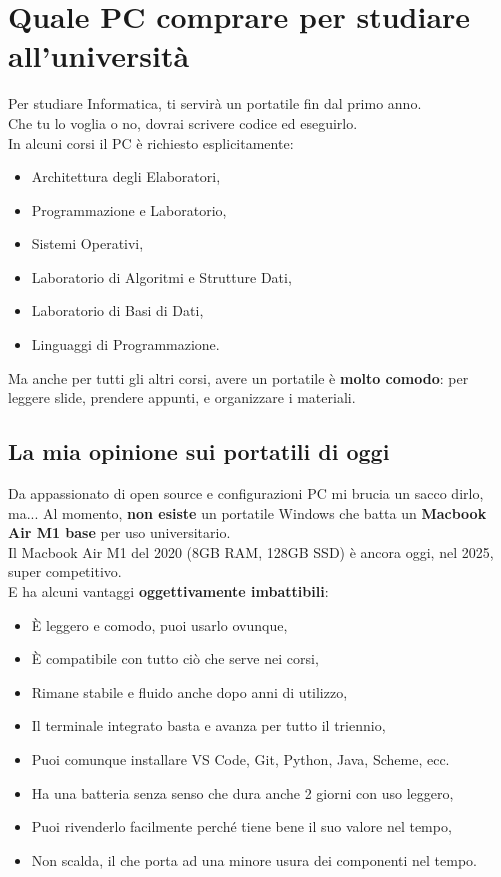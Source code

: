 \documentclass[18pt]{extarticle}
\begin{document}
\section{Quale PC comprare per studiare all’università}
Per studiare Informatica, ti servirà un portatile fin dal primo anno.\\
Che tu lo voglia o no, dovrai scrivere codice ed eseguirlo.\\
In alcuni corsi il PC è richiesto esplicitamente:
\begin{itemize}
\item Architettura degli Elaboratori,
\item Programmazione e Laboratorio,
\item Sistemi Operativi,
\item Laboratorio di Algoritmi e Strutture Dati,
\item Laboratorio di Basi di Dati,
\item Linguaggi di Programmazione.
\end{itemize}
Ma anche per tutti gli altri corsi, avere un portatile è \textbf{molto comodo}: per leggere slide, prendere appunti, e organizzare i materiali.


\subsection{La mia opinione sui portatili di oggi}
Da appassionato di open source e configurazioni PC mi brucia un sacco dirlo, ma...
Al momento, \textbf{non esiste} un portatile Windows che batta un \textbf{Macbook Air M1 base} per uso universitario.\\
Il Macbook Air M1 del 2020 (8GB RAM, 128GB SSD) è ancora oggi, nel 2025, super competitivo.\\
E ha alcuni vantaggi \textbf{oggettivamente imbattibili}:
\begin{itemize}
\item È leggero e comodo, puoi usarlo ovunque,
\item È compatibile con tutto ciò che serve nei corsi,
\item Rimane stabile e fluido anche dopo anni di utilizzo,
\item Il terminale integrato basta e avanza per tutto il triennio,
\item Puoi comunque installare VS Code, Git, Python, Java, Scheme, ecc.
\item Ha una batteria senza senso che dura anche 2 giorni con uso leggero,
\item Puoi rivenderlo facilmente perché tiene bene il suo valore nel tempo,
\item Non scalda, il che porta ad una minore usura dei componenti nel tempo.
\end{itemize}
\end{document}
